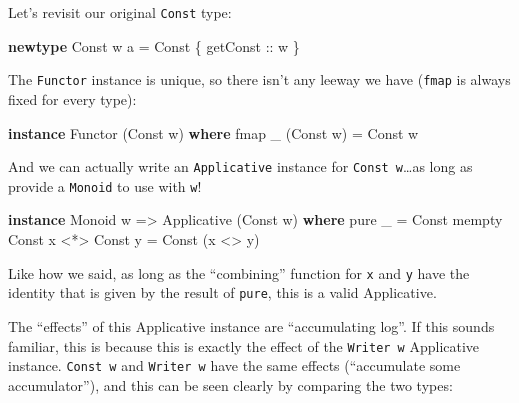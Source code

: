 \documentclass[]{article}
\newenvironment{Shaded}{}{}
\newcommand{\DataTypeTok}[1]{\textcolor[rgb]{0.56,0.13,0.00}{#1}}
\newcommand{\FunctionTok}[1]{\textcolor[rgb]{0.02,0.16,0.49}{#1}}
\newcommand{\KeywordTok}[1]{\textcolor[rgb]{0.00,0.44,0.13}{\textbf{#1}}}
\newcommand{\NormalTok}[1]{#1}
\newcommand{\OtherTok}[1]{\textcolor[rgb]{0.00,0.44,0.13}{#1}}
\begin{document}
Let's revisit our original \texttt{Const} type:

\begin{Shaded}
\begin{Highlighting}[]
\KeywordTok{newtype} \DataTypeTok{Const}\NormalTok{ w a }\FunctionTok{=} \DataTypeTok{Const}\NormalTok{ \{}\OtherTok{ getConst ::}\NormalTok{ w \}}
\end{Highlighting}
\end{Shaded}

The \texttt{Functor} instance is unique, so there isn't any leeway we have
(\texttt{fmap} is always fixed for every type):

\begin{Shaded}
\begin{Highlighting}[]
\KeywordTok{instance} \DataTypeTok{Functor}\NormalTok{ (}\DataTypeTok{Const}\NormalTok{ w) }\KeywordTok{where}
\NormalTok{    fmap _ (}\DataTypeTok{Const}\NormalTok{ w) }\FunctionTok{=} \DataTypeTok{Const}\NormalTok{ w}
\end{Highlighting}
\end{Shaded}

And we can actually write an \texttt{Applicative} instance for
\texttt{Const\ w}\ldots{}as long as provide a \texttt{Monoid} to use with
\texttt{w}!

\begin{Shaded}
\begin{Highlighting}[]
\KeywordTok{instance} \DataTypeTok{Monoid}\NormalTok{ w }\OtherTok{=>} \DataTypeTok{Applicative}\NormalTok{ (}\DataTypeTok{Const}\NormalTok{ w) }\KeywordTok{where}
\NormalTok{    pure _ }\FunctionTok{=} \DataTypeTok{Const}\NormalTok{ mempty}
    \DataTypeTok{Const}\NormalTok{ x }\FunctionTok{<*>} \DataTypeTok{Const}\NormalTok{ y }\FunctionTok{=} \DataTypeTok{Const}\NormalTok{ (x }\FunctionTok{<>}\NormalTok{ y)}
\end{Highlighting}
\end{Shaded}

Like how we said, as long as the ``combining'' function for \texttt{x} and
\texttt{y} have the identity that is given by the result of \texttt{pure}, this
is a valid Applicative.

The ``effects'' of this Applicative instance are ``accumulating log''. If this
sounds familiar, this is because this is exactly the effect of the
\texttt{Writer\ w} Applicative instance. \texttt{Const\ w} and
\texttt{Writer\ w} have the same effects (``accumulate some accumulator''), and
this can be seen clearly by comparing the two types:
\end{document}
